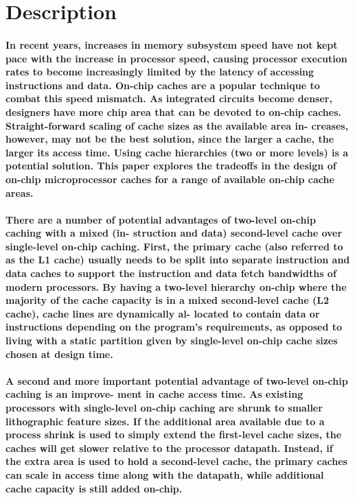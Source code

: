 \documentclass{article}
\title{}
\author{}
\date{}
\begin{document}
\tableofcontents



\maketitle 



\section{Description}

\paragraph{In recent years, increases in memory subsystem speed have not kept pace with the increase in
processor speed, causing processor execution rates to become increasingly limited by the latency
of accessing instructions and data. On-chip caches are a popular technique to combat this speed
mismatch. As integrated circuits become denser, designers have more chip area that can be
devoted to on-chip caches. Straight-forward scaling of cache sizes as the available area in-
creases, however, may not be the best solution, since the larger a cache, the larger its access
time. Using cache hierarchies (two or more levels) is a potential solution. This paper explores
the tradeoffs in the design of on-chip microprocessor caches for a range of available on-chip
cache areas.}

\paragraph{There are a number of potential advantages of two-level on-chip caching with a mixed (in-
struction and data) second-level cache over single-level on-chip caching. First, the primary
cache (also referred to as the L1 cache) usually needs to be split into separate instruction and
data caches to support the instruction and data fetch bandwidths of modern processors. By having a
 two-level hierarchy on-chip where the majority of the
cache capacity is in a mixed second-level cache (L2 cache), cache lines are dynamically al-
located to contain data or instructions depending on the program’s requirements, as opposed to
living with a static partition given by single-level on-chip cache sizes chosen at design time.}

\paragraph{A second and more important potential advantage of two-level on-chip caching is an improve-
ment in cache access time. As existing processors with single-level on-chip caching are shrunk
to smaller lithographic feature sizes. If the additional area available due to a process shrink is used 
to simply extend the first-level cache sizes, the caches will get
slower relative to the processor datapath. Instead, if the extra area is used to hold a second-level
cache, the primary caches can scale in access time along with the datapath, while additional
cache capacity is still added on-chip.}
\end{document}
